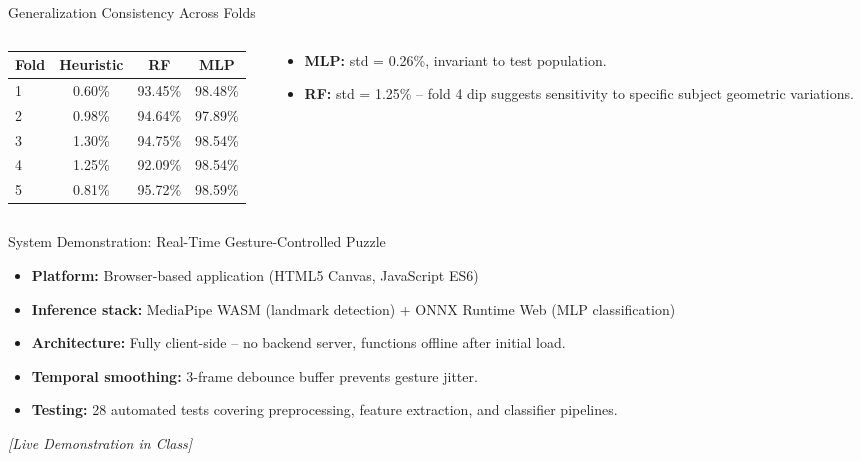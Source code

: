 \documentclass[10pt, aspectratio=169]{beamer}
\begin{document}
\begin{frame}{Generalization Consistency Across Folds}
    \begin{columns}
        \begin{column}{0.55\textwidth}
            \begin{table}
                \footnotesize
                \begin{tabular}{@{}lccc@{}}
                    \toprule
                    \textbf{Fold} & \textbf{Heuristic} & \textbf{RF} & \textbf{MLP} \\
                    \midrule
                    1 & 0.60\% & 93.45\% & 98.48\% \\
                    2 & 0.98\% & 94.64\% & 97.89\% \\
                    3 & 1.30\% & 94.75\% & 98.54\% \\
                    4 & 1.25\% & 92.09\% & 98.54\% \\
                    5 & 0.81\% & 95.72\% & 98.59\% \\
                    \bottomrule
                \end{tabular}
            \end{table}
        \end{column}
        \begin{column}{0.45\textwidth}
            \begin{itemize}
                \item \textbf{MLP:} std = 0.26\%, invariant to test population.
                \item \textbf{RF:} std = 1.25\% -- fold 4 dip suggests sensitivity to specific subject geometric variations.
            \end{itemize}
        \end{column}
    \end{columns}
\end{frame}

\begin{frame}{System Demonstration: Real-Time Gesture-Controlled Puzzle}
    \begin{itemize}
        \item \textbf{Platform:} Browser-based application (HTML5 Canvas, JavaScript ES6)
        \item \textbf{Inference stack:} MediaPipe WASM (landmark detection) + ONNX Runtime Web (MLP classification)
        \item \textbf{Architecture:} Fully client-side -- no backend server, functions offline after initial load.
        \item \textbf{Temporal smoothing:} 3-frame debounce buffer prevents gesture jitter.
        \item \textbf{Testing:} 28 automated tests covering preprocessing, feature extraction, and classifier pipelines.
    \end{itemize}
    \vspace{0.3cm}
    \centering
    \textit{[Live Demonstration in Class]}
\end{frame}
\end{document}
